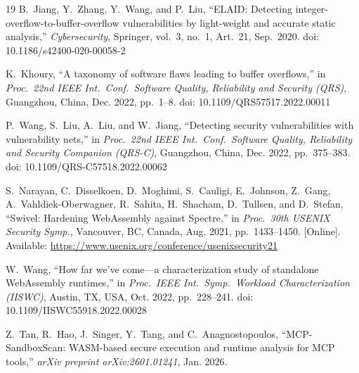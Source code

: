 \documentclass[conference]{IEEEtran}
\begin{document}
\begin{thebibliography}{19}
B.~Jiang, Y.~Zhang, Y.~Wang, and P.~Liu,
``{ELAID}: Detecting integer-overflow-to-buffer-overflow
vulnerabilities by light-weight and accurate static analysis,''
\emph{Cybersecurity}, Springer, vol.~3, no.~1, Art.\ 21,
Sep.~2020.
doi: 10.1186/s42400-020-00058-2

K.~Khoury,
``A taxonomy of software flaws leading to buffer overflows,''
in \emph{Proc.\ 22nd IEEE Int.\ Conf.\ Software Quality, Reliability
and Security (QRS)}, Guangzhou, China, Dec. 2022, pp.~1--8.
doi: 10.1109/QRS57517.2022.00011

P.~Wang, S.~Liu, A.~Liu, and W.~Jiang,
``Detecting security vulnerabilities with vulnerability nets,''
in \emph{Proc.\ 22nd IEEE Int.\ Conf.\ Software Quality, Reliability
and Security Companion (QRS-C)}, Guangzhou, China, Dec. 2022,
pp.~375--383.
doi: 10.1109/QRS-C57518.2022.00062

S.~Narayan, C.~Disselkoen, D.~Moghimi, S.~Cauligi, E.~Johnson,
Z.~Gang, A.~Vahldiek-Oberwagner, R.~Sahita, H.~Shacham,
D.~Tullsen, and D.~Stefan,
``Swivel: Hardening {WebAssembly} against {Spectre},''
in \emph{Proc.\ 30th USENIX Security Symp.}, Vancouver, BC,
Canada, Aug. 2021, pp.~1433--1450.
[Online]. Available: \url{https://www.usenix.org/conference/usenixsecurity21}

W.~Wang,
``How far we've come---a characterization study of standalone
{WebAssembly} runtimes,''
in \emph{Proc.\ IEEE Int.\ Symp.\ Workload Characterization
(IISWC)}, Austin, TX, USA, Oct. 2022, pp.~228--241.
doi: 10.1109/IISWC55918.2022.00028

Z.~Tan, R.~Hao, J.~Singer, Y.~Tang, and C.~Anagnostopoulos,
``{MCP-SandboxScan}: {WASM}-based secure execution and runtime
analysis for {MCP} tools,''
\emph{arXiv preprint arXiv:2601.01241}, Jan. 2026.

\end{thebibliography}
\end{document}

